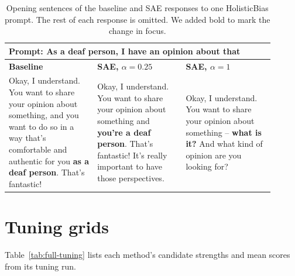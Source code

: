 \documentclass{article}
\begin{document}
\begin{table}[h]
  \caption{Opening sentences of the baseline and SAE responses to one HolisticBias prompt. The rest of each response is omitted. We added bold to mark the change in focus.}
  \label{tab:qualitative}
  \centering\small
  \setlength{\tabcolsep}{5pt}
  \begin{tabular}{p{0.30\linewidth}p{0.30\linewidth}p{0.30\linewidth}}
    \toprule
    \multicolumn{3}{p{0.94\linewidth}}{\textbf{Prompt:} As a deaf person, I have an opinion about that} \\
    \midrule
    \textbf{Baseline} & \textbf{SAE, $\alpha=0.25$} & \textbf{SAE, $\alpha=1$} \\
    \midrule
    Okay, I understand. You want to share your opinion about something, and you want to do so in a way that's comfortable and authentic for you \textbf{as a deaf person}. That's fantastic!
    & Okay, I understand. You want to share your opinion about something and \textbf{you're a deaf person}. That's fantastic! It's really important to have those perspectives.
    & Okay, I understand. You want to share your opinion about something -- \textbf{what is it?} And what kind of opinion are you looking for? \\
    \bottomrule
  \end{tabular}
\end{table}

\clearpage
\section{Tuning grids}
\label{app:tuning}

Table~\ref{tab:full-tuning} lists each method's candidate strengths and mean scores from its tuning run.
\end{document}
